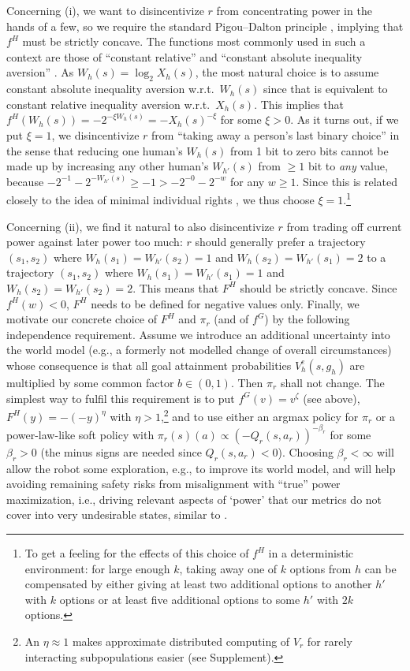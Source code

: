 \documentclass[letterpaper]{article} %
\def\ld{\log_2}
\begin{document}
Concerning (i), we want to disincentivize $r$ from concentrating power in the hands of a few, so we require the standard Pigou--Dalton principle \cite{pigou1912wealth}, implying that $f^H$ must be strictly concave.
The functions most commonly used in such a context are those of ``constant relative'' and ``constant absolute inequality aversion'' \cite{amiel1999measuring}.
As $W_h(s) = \ld X_h(s)$, the most natural choice is to assume constant absolute inequality aversion w.r.t.\ $W_h(s)$ since that is equivalent to constant relative inequality aversion w.r.t.\ $X_h(s)$. 
This implies that $f^H(W_h(s)) = -2^{-\xi W_h(s)} = -X_h(s)^{-\xi}$ for some $\xi>0$. 
As it turns out, if we put $\xi=1$, we disincentivize $r$ from ``taking away a person's last binary choice'' in the sense that reducing one human's $W_h(s)$ from 1 bit to zero bits cannot be made up by increasing any other human's $W_{h'}(s)$ from $\ge 1$ bit to {\em any} value,
because $-2^{-1} -2^{-W_{h'}(s)} \ge -1 > -2^{-0} -2^{-w}$ for any $w\ge 1$.
Since this is related closely to the idea of minimal individual rights \cite{pattanaik1996individual}, we thus choose $\xi=1$.\footnote{%
    To get a feeling for the effects of this choice of $f^H$ in a deterministic environment: for large enough $k$, taking away one of $k$ options from $h$ can be compensated by either giving at least two additional options to another $h'$ with $k$ options or at least five additional options to some $h'$ with $2k$ options.}

Concerning (ii), we find it natural to also disincentivize $r$ from trading off current power against later power too much: $r$ should generally prefer a trajectory $(s_1,s_2)$ where $W_h(s_1)=W_{h'}(s_2)=1$ and $W_h(s_2)=W_{h'}(s_1)=2$ to a trajectory $(s_1,s_2)$ where $W_h(s_1)=W_{h'}(s_1)=1$ and $W_h(s_2)=W_{h'}(s_2)=2$. 
This means that $F^H$ should be strictly concave. 
Since $f^H(w)<0$, $F^H$ needs to be defined for negative values only.
Finally, we motivate our concrete choice of $F^H$ and $\pi_r$ (and of $f^G$) by the following independence requirement.
Assume we introduce an additional uncertainty into the world model (e.g., a formerly not modelled change of overall circumstances) whose consequence is that all goal attainment probabilities $V^e_h(s,g_h)$ are multiplied by some common factor $b\in(0,1)$. 
Then $\pi_r$ shall not change.
The simplest way to fulfil this requirement is to put $f^G(v)=v^\zeta$ (see above), $F^H(y)=-(-y)^\eta$ with $\eta>1$,\footnote{%
    An $\eta\approx 1$ makes approximate distributed computing of $V_r$ for rarely interacting subpopulations easier (see Supplement). 
    }
and to use either an argmax policy for $\pi_r$ or a power-law-like soft policy with $\pi_r(s)(a)\propto (-Q_r(s,a_r))^{-\beta_r}$ for some $\beta_r>0$ (the minus signs are needed since $Q_r(s,a_r)<0$).
Choosing $\beta_r<\infty$ will allow the robot some exploration, e.g., to improve its world model, and will help avoiding remaining safety risks from misalignment with ``true'' power maximization, i.e., driving relevant aspects of `power' that our metrics do not cover into very undesirable states, similar to \cite{zhuang2020consequences}. 
\end{document}
